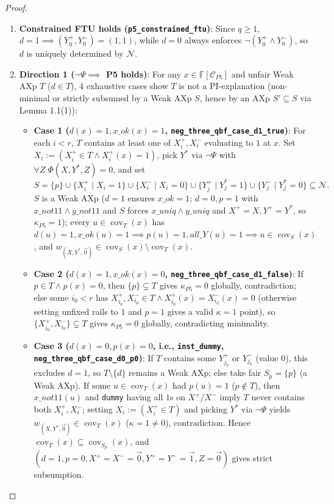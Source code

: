 \documentclass[11pt,a4paper]{article}
\newcommand{\F}{\mathbb{F}}
\newcommand{\C}{\mathcal{C}}
\newcommand{\N}{\mathcal{N}}
\newcommand{\cov}{\operatorname{cov}}
\newcommand{\code}[1]{\texttt{\small #1}}
\begin{document}
\begin{proof}
\begin{enumerate}
  \item \textbf{Constrained FTU holds (\code{p5\_constrained\_ftu})}: Since $q \ge 1$, $d=1 \implies (Y_0^+,Y_0^-)=(1,1)$, while $d=0$ always enforces $\neg(Y_0^+ \land Y_0^-)$, so $d$ is uniquely determined by $\N$.
  \item \textbf{Direction 1 ($\neg\Psi \implies$ P5 holds)}: For any $x \in \F[\C_{P5}]$ and unfair Weak AXp $T$ ($d \in T$), 4 exhaustive cases show $T$ is not a PI-explanation (non-minimal or strictly subsumed by a Weak AXp $S$, hence by an AXp $S' \subseteq S$ via Lemma 1.1(1)):
  \begin{itemize}
    \item \textbf{Case 1 ($d(x)=1, x\_ok(x)=1$, \code{neg\_three\_qbf\_case\_d1\_true})}: For each $i<r$, $T$ contains at least one of $X_i^+, X_i^-$ evaluating to $1$ at $x$. Set $X_i := (X_i^+ \in T \land X_i^+(x)=1)$, pick $Y^*$ via $\neg\Psi$ with $\forall Z\;\Phi(X,Y^*,Z)=0$, and set
    \[
      S = \{p\} \cup \{X_i^+ \mid X_i=1\} \cup \{X_i^- \mid X_i=0\} \cup \{Y_j^+ \mid Y^*_j=1\} \cup \{Y_j^- \mid Y^*_j=0\} \subseteq \N.
    \]
    $S$ is a Weak AXp ($d=1$ ensures $x\_ok=1$; $d=0, p=1$ with $x\_not11 \land y\_not11$ and $S$ forces $x\_uniq \land y\_uniq$ and $X^+=X, Y^+=Y^*$, so $\kappa_{P5}=1$); every $u \in \cov_T(x)$ has $d(u)=1, x\_ok(u)=1 \implies p(u)=1, all\_Y(u)=1 \implies u \in \cov_S(x)$, and $w_{(X,Y^*,\vec{0})} \in \cov_S(x) \setminus \cov_T(x)$.
    \item \textbf{Case 2 ($d(x)=1, x\_ok(x)=0$, \code{neg\_three\_qbf\_case\_d1\_false})}: If $p \in T \land p(x)=0$, then $\{p\} \subsetneq T$ gives $\kappa_{P5}=0$ globally, contradiction; else some $i_0<r$ has $X_{i_0}^+, X_{i_0}^- \in T \land X_{i_0}^+(x)=X_{i_0}^-(x)=0$ (otherwise setting unfixed rails to $1$ and $p=1$ gives a valid $\kappa=1$ point), so $\{X_{i_0}^+, X_{i_0}^-\} \subsetneq T$ gives $\kappa_{P5}=0$ globally, contradicting minimality.
    \item \textbf{Case 3 ($d(x)=0, p(x)=0$, i.e., \code{inst\_dummy}, \code{neg\_three\_qbf\_case\_d0\_p0})}: If $T$ contains some $Y_{j_0}^+$ or $Y_{j_0}^-$ (value $0$), this excludes $d=1$, so $T \setminus \{d\}$ remains a Weak AXp; else take fair $S_p=\{p\}$ (a Weak AXp). If some $u \in \cov_T(x)$ had $p(u)=1$ ($p \notin T$), then $x\_not11(u)$ and \code{dummy} having all $1$s on $X^+/X^-$ imply $T$ never contains both $X_i^+, X_i^-$; setting $X_i:=(X_i^+ \in T)$ and picking $Y^*$ via $\neg\Psi$ yields $w_{(X,Y^*,\vec{0})} \in \cov_T(x)$ ($\kappa=1 \ne 0$), contradiction. Hence $\cov_T(x) \subseteq \cov_{S_p}(x)$, and $(d=1, p=0, X^+=X^-=\vec{0}, Y^+=Y^-=\vec{1}, Z=\vec{0})$ gives strict subsumption.

\end{itemize}
\end{enumerate}
\end{proof}
\end{document}

